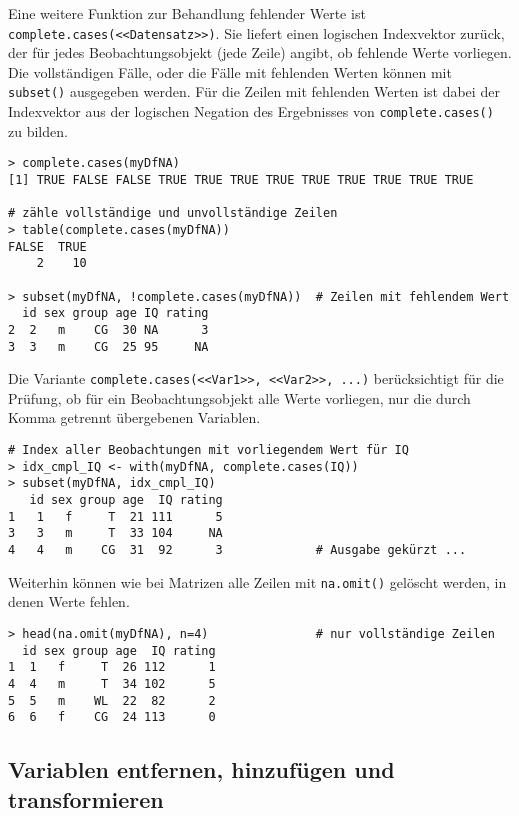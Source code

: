 Eine weitere Funktion zur Behandlung fehlender Werte ist \lstinline!complete.cases(<<Datensatz>>)!. Sie liefert einen logischen Indexvektor zurück, der für jedes Beobachtungsobjekt (jede Zeile) angibt, ob fehlende Werte vorliegen. Die vollständigen Fälle, oder die Fälle mit fehlenden Werten können mit \lstinline!subset()! ausgegeben werden. Für die Zeilen mit fehlenden Werten ist dabei der Indexvektor aus der logischen Negation des Ergebnisses von \lstinline!complete.cases()! zu bilden.
\begin{lstlisting}
> complete.cases(myDfNA)
[1] TRUE FALSE FALSE TRUE TRUE TRUE TRUE TRUE TRUE TRUE TRUE TRUE

# zähle vollständige und unvollständige Zeilen
> table(complete.cases(myDfNA))
FALSE  TRUE 
    2    10

> subset(myDfNA, !complete.cases(myDfNA))  # Zeilen mit fehlendem Wert
  id sex group age IQ rating
2  2   m    CG  30 NA      3
3  3   m    CG  25 95     NA
\end{lstlisting}

Die Variante \lstinline!complete.cases(<<Var1>>, <<Var2>>, ...)! berücksichtigt für die Prüfung, ob für ein Beobachtungsobjekt alle Werte vorliegen, nur die durch Komma getrennt übergebenen Variablen.
\begin{lstlisting}
# Index aller Beobachtungen mit vorliegendem Wert für IQ
> idx_cmpl_IQ <- with(myDfNA, complete.cases(IQ))
> subset(myDfNA, idx_cmpl_IQ)
   id sex group age  IQ rating
1   1   f     T  21 111      5
3   3   m     T  33 104     NA
4   4   m    CG  31  92      3             # Ausgabe gekürzt ...
\end{lstlisting}

Weiterhin können wie bei Matrizen alle Zeilen mit \lstinline!na.omit()! gelöscht werden, in denen Werte fehlen.
\begin{lstlisting}
> head(na.omit(myDfNA), n=4)               # nur vollständige Zeilen
  id sex group age  IQ rating
1  1   f     T  26 112      1
4  4   m     T  34 102      5
5  5   m    WL  22  82      2
6  6   f    CG  24 113      0
\end{lstlisting}

\subsection{Variablen entfernen, hinzufügen und transformieren}
\label{sec:df_transform}

